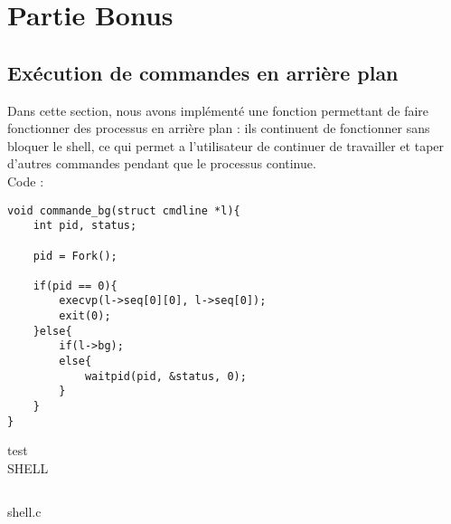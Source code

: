\documentclass{report}
\begin{document}
	\chapter{Partie Bonus}
		\section{Ex\'ecution de commandes en arri\`ere plan}
	Dans cette section, nous avons impl\'ement\'e une fonction permettant de faire fonctionner des processus en arri\`ere plan : ils continuent de fonctionner sans bloquer le shell, ce qui permet a l'utilisateur de continuer de travailler et taper d'autres commandes pendant que le processus continue.\\Code :
			\begin{lstlisting}
void commande_bg(struct cmdline *l){
	int pid, status;

	pid = Fork();

	if(pid == 0){
		execvp(l->seq[0][0], l->seq[0]);
		exit(0);
	}else{
		if(l->bg);
		else{
			waitpid(pid, &status, 0);
		}
	}
}
			\end{lstlisting}
			test \\ SHELL
			\begin{lstlisting}[frame=single,basicstyle=\footnotesize,language=bash]
			\end{lstlisting}
			shell.c
			\begin{lstlisting}[frame=single,basicstyle=\footnotesize,language=bash]
			\end{lstlisting}
\end{document}
